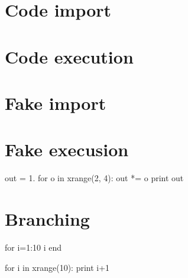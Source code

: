 \documentclass{article}
\begin{document}
\section*{Code import}


\section*{Code execution}


\section*{Fake import}



\section*{Fake execusion}

out = 1.
for o in xrange(2, 4):
    out *= o
print out

\section*{Branching}

for i=1:10
    i
end

for i in xrange(10):
    print i+1
\end{document}

